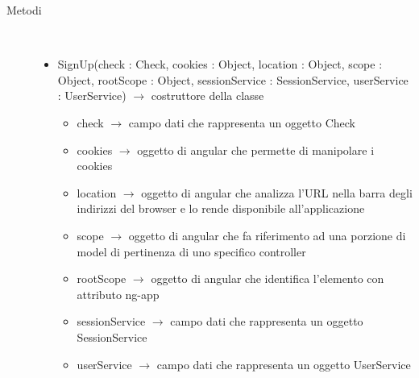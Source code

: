 \begin{description}
\item[Metodi] \hfill \\
\vspace{-7mm}
\begin{itemize}
	\item SignUp(check : Check, cookies : Object, location : Object, scope : Object, rootScope : Object, sessionService : SessionService, userService : UserService) $\rightarrow$ costruttore della classe\begin{itemize}
		\item check $\rightarrow$ campo dati che rappresenta un oggetto Check
		\item cookies $\rightarrow$ oggetto di angular che permette di manipolare i cookies
		\item location $\rightarrow$ oggetto di angular che analizza l'URL nella barra degli indirizzi del browser e lo rende disponibile all'applicazione
		\item scope $\rightarrow$ oggetto di angular che fa riferimento ad una porzione di model di pertinenza di uno specifico controller
		\item rootScope $\rightarrow$ oggetto di angular che identifica l’elemento con attributo ng-app
		\item sessionService $\rightarrow$ campo dati che rappresenta un oggetto SessionService
		\item userService $\rightarrow$ campo dati che rappresenta un oggetto UserService
	\end{itemize}
	

\end{itemize}
\end{description}
